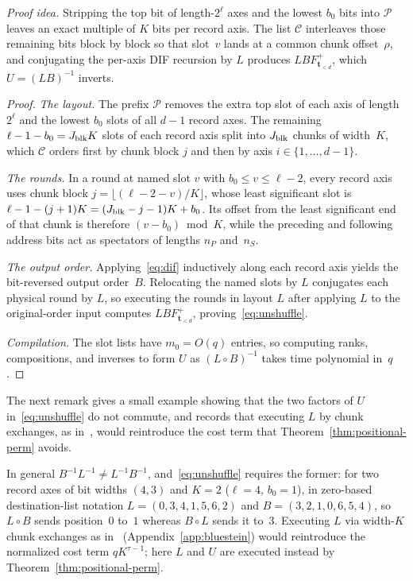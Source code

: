 \emph{Proof idea.} Stripping the top bit of length-$2^\ell$ axes and the lowest $b_0$ bits into $\mathcal P$ leaves an
exact multiple of $K$ bits per record axis. The list $\mathcal C$ interleaves those remaining bits block by block so
that slot~$v$ lands at a common chunk offset~$\rho$, and conjugating the per-axis DIF recursion by $L$ produces
$LBF^+_{\mathbf t_{<d}}$, which $U=(LB)^{-1}$ inverts.

\begin{proof}
\emph{The layout.} The prefix $\mathcal P$ removes the extra top slot of each axis of length $2^\ell$ and the lowest
$b_0$ slots of all $d-1$ record axes. The remaining $\ell-1-b_0=J_{\rm blk}K$ slots of each record axis split into
$J_{\rm blk}$ chunks of width~$K$, which $\mathcal C$ orders first by chunk block $j$ and then by axis $i\in\{1,\dots,d-1\}$.

\emph{The rounds.} In a round at named slot $v$ with $b_0\le v\le\ell-2$, every record axis uses chunk block
$j=\lfloor(\ell-2-v)/K\rfloor$, whose least significant slot is $\ell-1-(j+1)K=(J_{\rm blk}-j-1)K+b_0$. Its offset from
the least significant end of that chunk is therefore $(v-b_0)\bmod K$, while the preceding and following address bits act
as spectators of lengths $n_P$ and~$n_S$.

\emph{The output order.} Applying~\eqref{eq:dif} inductively along each record axis yields the bit-reversed output
order~$B$. Relocating the named slots by $L$ conjugates each physical round by $L$, so executing the rounds in layout
$L$ after applying $L$ to the original-order input computes $LBF^+_{\mathbf t_{<d}}$, proving~\eqref{eq:unshuffle}.

\emph{Compilation.} The slot lists have $m_0=O(q)$ entries, so computing ranks, compositions, and inverses to form $U$ as
$(L\circ B)^{-1}$ takes time polynomial in~$q$.
\end{proof}

The next remark gives a small example showing that the two factors of $U$ in~\eqref{eq:unshuffle} do not commute, and
records that executing $L$ by chunk exchanges, as in~\cite{OAI26}, would reintroduce the cost term that
Theorem~\ref{thm:positional-perm} avoids.

\begin{remark}\label{rem:walsh-unshuffle}
In general $B^{-1}L^{-1}\ne L^{-1}B^{-1}$, and~\eqref{eq:unshuffle} requires the former: for two record axes of bit
widths $(4,3)$ and $K=2$ ($\ell=4$, $b_0=1$), in zero-based destination-list notation $L=(0,3,4,1,5,6,2)$ and
$B=(3,2,1,0,6,5,4)$, so $L\circ B$ sends position~$0$ to~$1$ whereas $B\circ L$ sends it to~$3$. Executing $L$ via
width-$K$ chunk exchanges as in~\cite[Lemma~16]{OAI26} (Appendix~\ref{app:bluestein}) would reintroduce the normalized
cost term $qK^{\tau-1}$; here $L$ and $U$ are executed instead by Theorem~\ref{thm:positional-perm}.
\end{remark}

